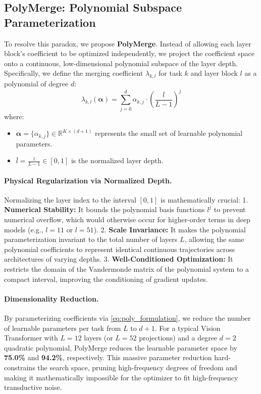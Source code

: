 \subsection{PolyMerge: Polynomial Subspace Parameterization}
To resolve this paradox, we propose \textbf{PolyMerge}. Instead of allowing each layer block's coefficient to be optimized independently, we project the coefficient space onto a continuous, low-dimensional polynomial subspace of the layer depth. Specifically, we define the merging coefficient $\lambda_{k, l}$ for task $k$ and layer block $l$ as a polynomial of degree $d$:
\begin{equation}
\label{eq:poly_formulation}
\lambda_{k, l}(\boldsymbol{\alpha}) = \sum_{j=0}^d \alpha_{k, j} \cdot \left( \frac{l}{L-1} \right)^j
\end{equation}
where:
\begin{itemize}
    \item $\boldsymbol{\alpha} = \{ \alpha_{k, j} \} \in \mathbb{R}^{K \times (d+1)}$ represents the small set of learnable polynomial parameters.
    \item $\bar{l} = \frac{l}{L-1} \in [0, 1]$ is the normalized layer depth.
\end{itemize}

\paragraph{Physical Regularization via Normalized Depth.} Normalizing the layer index to the interval $[0, 1]$ is mathematically crucial:
1. \textbf{Numerical Stability:} It bounds the polynomial basis functions $l^j$ to prevent numerical overflow, which would otherwise occur for higher-order terms in deep models (e.g., $l=11$ or $l=51$).
2. \textbf{Scale Invariance:} It makes the polynomial parameterization invariant to the total number of layers $L$, allowing the same polynomial coefficients to represent identical continuous trajectories across architectures of varying depths.
3. \textbf{Well-Conditioned Optimization:} It restricts the domain of the Vandermonde matrix of the polynomial system to a compact interval, improving the conditioning of gradient updates.

\paragraph{Dimensionality Reduction.} By parameterizing coefficients via \eqref{eq:poly_formulation}, we reduce the number of learnable parameters per task from $L$ to $d+1$. For a typical Vision Transformer with $L=12$ layers (or $L=52$ projections) and a degree $d=2$ quadratic polynomial, PolyMerge reduces the learnable parameter space by \textbf{75.0\%} and \textbf{94.2\%}, respectively. This massive parameter reduction hard-constrains the search space, pruning high-frequency degrees of freedom and making it mathematically impossible for the optimizer to fit high-frequency transductive noise.


